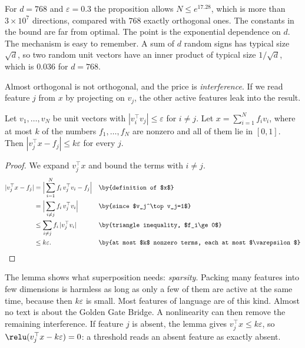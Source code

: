 For $d=768$ and $\varepsilon=0.3$ the proposition allows $N\le e^{17.28}$, which is more than $3\times10^7$
directions, compared with $768$ exactly orthogonal ones. The constants in the bound are far from optimal. The
point is the exponential dependence on $d$. The mechanism is easy to remember. A sum of $d$ random signs has
typical size $\sqrt d$, so two random unit vectors have an inner product of typical size $1/\sqrt d$, which is
$0.036$ for $d=768$.

Almost orthogonal is not orthogonal, and the price is \emph{interference}. If we read feature $j$ from $x$ by
projecting on $v_j$, the other active features leak into the result.

\begin{lemma}\label{lem:interference}
Let $v_1,\dots,v_N$ be unit vectors with $|v_i^\top v_j|\le\varepsilon$ for $i\ne j$. Let $x=\sum_{i=1}^{N}f_iv_i$,
where at most $k$ of the numbers $f_1,\dots,f_N$ are nonzero and all of them lie in $[0,1]$. Then
$|v_j^\top x-f_j|\le k\varepsilon$ for every $j$.
\end{lemma}
\begin{proof}
We expand $v_j^\top x$ and bound the terms with $i\ne j$.
\begin{align*}
|v_j^\top x-f_j| &= \Big|\sum_{i=1}^{N}f_i\,v_j^\top v_i-f_j\Big| && \by{definition of $x$}\\
&= \Big|\sum_{i\ne j}f_i\,v_j^\top v_i\Big| && \by{since $v_j^\top v_j=1$}\\
&\le \sum_{i\ne j}f_i\,|v_j^\top v_i| && \by{triangle inequality, $f_i\ge0$}\\
&\le k\varepsilon. && \by{at most $k$ nonzero terms, each at most $\varepsilon$}\qedhere
\end{align*}
\end{proof}

The lemma shows what superposition needs: \emph{sparsity}. Packing many features into few dimensions is
harmless as long as only a few of them are active at the same time, because then $k\varepsilon$ is small. Most
features of language are of this kind. Almost no text is about the Golden Gate Bridge. A nonlinearity can
then remove the remaining interference. If feature $j$ is absent, the lemma gives $v_j^\top x\le k\varepsilon$,
so $\relu(v_j^\top x-k\varepsilon)=0$: a threshold reads an absent feature as exactly absent.


